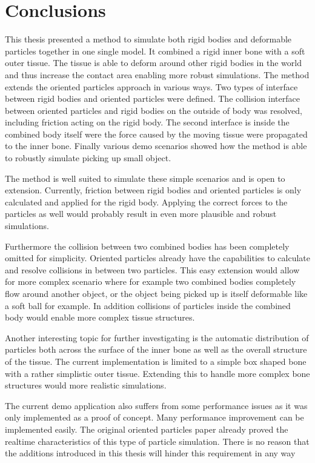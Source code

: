 \chapter{Conclusions}
\label{cha:conclusions}

This thesis presented a method to simulate both rigid bodies and deformable particles together in one single model. It combined a rigid inner bone with a soft outer tissue. The tissue is able to deform around other rigid bodies in the world and thus increase the contact area enabling more robust simulations. The method extends the oriented particles approach in various ways. Two types of interface between rigid bodies and oriented particles were defined. The collision interface between oriented particles and rigid bodies on the outside of body was resolved, including friction acting on the rigid body. The second interface is inside the combined body itself were the force caused by the moving tissue were propagated to the inner bone. Finally various demo scenarios showed how the method is able to robustly simulate picking up small object.

The method is well suited to simulate these simple scenarios and is open to extension. Currently, friction between rigid bodies and oriented particles is only calculated and applied for the rigid body. Applying the correct forces to the particles as well would probably result in even more plausible and robust simulations.

Furthermore the collision between two combined bodies has been completely omitted for simplicity. Oriented particles already have the capabilities to calculate and resolve collisions in between two particles. This easy extension would allow for more complex scenario where for example two combined bodies completely flow around another object, or the object being picked up is itself deformable like a soft ball for example. In addition collisions of particles inside the combined body would enable more complex tissue structures.

Another interesting topic for further investigating is the automatic distribution of particles both across the surface of the inner bone as well as the overall structure of the tissue. The current implementation is limited to a simple box shaped bone with a rather simplistic outer tissue. Extending this to handle more complex bone structures would more realistic simulations.

The current demo application also suffers from some performance issues as it was only implemented as a proof of concept. Many performance improvement can be implemented easily. The original oriented particles paper already proved the realtime characteristics of this type of particle simulation. There is no reason that the additions introduced in this thesis will hinder this requirement in any way

